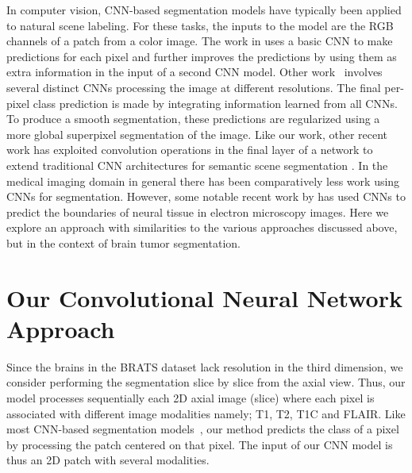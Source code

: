 \documentclass[final,5p,times,twocolumn]{elsarticle}
\begin{document}
In computer vision, CNN-based segmentation models have typically been applied to natural scene labeling.
For these tasks, the inputs to the model are the RGB channels of a patch from a color image. The work in \citet{pinheiro2014} uses a basic CNN to make predictions for each pixel and further improves the predictions by using them as extra information in the input of a second CNN model. Other work~\citep{farabet2013} involves several distinct CNNs processing the image at different resolutions. The final per-pixel class prediction is made by integrating information learned from all CNNs. To produce a smooth segmentation, these predictions are regularized using a more global superpixel segmentation of the image. Like our work, other recent work has exploited convolution operations in the final layer of a network to extend traditional CNN architectures for semantic scene segmentation \citep{long_shelhamer_fcn}. 
In the medical imaging domain in general there has been comparatively less work using CNNs for segmentation. However, some notable recent work by \citet{DeepAndWide2013} has used CNNs to predict the boundaries of neural tissue in electron microscopy images. Here we explore an approach with similarities to the various approaches discussed above, but in the context of brain tumor segmentation.











\section{Our Convolutional Neural Network Approach}
\label{sec:CNNApproach}


Since the brains in the BRATS dataset 
lack resolution in the third dimension, we consider performing the segmentation slice by slice from the axial view. 
Thus, our model processes sequentially each 2D axial image (slice) where each pixel is associated with different image modalities namely; T1, T2, T1C and FLAIR.  Like most CNN-based segmentation models~\citep{pinheiro2014,farabet2013}, our method predicts the class of a pixel by processing the  patch centered on that pixel.  The input  of our CNN model is thus an  2D patch with several modalities.
\end{document}
